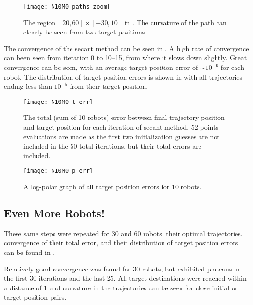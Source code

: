 \documentclass[11pt]{article}
\begin{document}
\begin{figure}
	\centering
	\texttt{[image: N10M0\_paths\_zoom]}
	\caption{The region \([20,60] \times [-30,10]\) in . The curvature of the path can clearly be seen from two target positions.}
	\label{fig:n10m0-paths-zoom}
\end{figure}

\clearpage

The convergence of the secant method can be seen in . A high rate of convergence can been seen from iteration 0 to 10--15, from where it slows down slightly. Great convergence can be seen, with an average target position error of \(\sim 10^{-6}\) for each robot. The distribution of target position errors is shown in  with all trajectories ending less than \(10^{-5}\) from their target position.

\begin{figure}
	\centering
	\texttt{[image: N10M0\_t\_err]}
	\caption{The total (sum of 10 robots) error between final trajectory position and target position for each iteration of secant method. 52 points evaluations are made as the first two initialization guesses are not included in the 50 total iterations, but their total errors are included.}
	\label{fig:n10m0-t-err}
\end{figure}

\begin{figure}
	\centering
	\texttt{[image: N10M0\_p\_err]}
	\caption{A log-polar graph of all target position errors for 10 robots.}
	\label{fig:n10m0-p-err}
\end{figure}

\clearpage

\subsection{Even More Robots!}

These same steps were repeated for 30 and 60 robots; their optimal trajectories, convergence of their total error, and their distribution of target position errors can be found in .

Relatively good convergence was found for 30 robots, but exhibited plateaus in the first 30 iterations and the last 25. All target destinations were reached within a distance of 1 and curvature in the trajectories can be seen for close initial or target position pairs.
\end{document}
